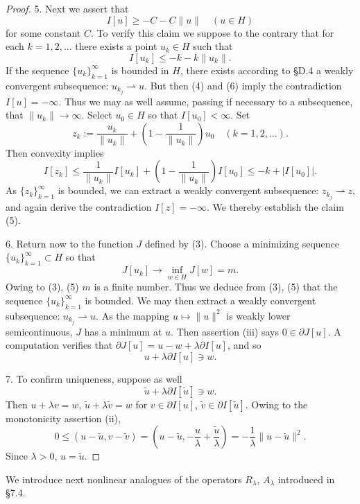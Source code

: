 \begin{proof}
5. Next we assert that
\[
I[u] \geq -C - C\|u\| \quad (u \in H)
\tag{5}
\]
for some constant $C$. To verify this claim we suppose to the contrary that for each $k = 1,2,\ldots$ there exists a point $u_k \in H$ such that
\[
I[u_k] \leq -k - k\|u_k\|.
\tag{6}
\]
If the sequence $\{u_k\}_{k=1}^\infty$ is bounded in $H$, there exists according to \S D.4 a weakly convergent subsequence: $u_{k_j} \rightharpoonup u$. But then (4) and (6) imply the contradiction $I[u] = -\infty$. Thus we may as well assume, passing if necessary to a subsequence, that $\|u_k\| \to \infty$. Select $u_0 \in H$ so that $I[u_0] < \infty$. Set
\[
z_k := \frac{u_k}{\|u_k\|} + \left(1 - \frac{1}{\|u_k\|}\right) u_0 \quad (k = 1,2,\ldots).
\]
Then convexity implies
\[
I[z_k] \le \frac{1}{\|u_k\|}I[u_k] + \left(1 - \frac{1}{\|u_k\|}\right) I[u_0] \le -k + |I[u_0]|.
\]
As $\{z_k\}_{k=1}^\infty$ is bounded, we can extract a weakly convergent subsequence: $z_{k_j} \rightharpoonup z$, and again derive the contradiction $I[z] = -\infty$. We thereby establish the claim (5).

6. Return now to the function $J$ defined by (3). Choose a minimizing sequence $\{u_k\}_{k=1}^\infty \subset H$ so that
\[
J[u_k] \to \inf_{w\in H} J[w] = m.
\]
Owing to (3), (5) $m$ is a finite number. Thus we deduce from (3), (5) that the sequence $\{u_k\}_{k=1}^\infty$ is bounded. We may then extract a weakly convergent subsequence: $u_{k_j} \rightharpoonup u$. As the mapping $u \mapsto \|u\|^2$ is weakly lower semicontinuous, $J$ has a minimum at $u$. Then assertion (iii) says $0 \in \partial J[u]$. A computation verifies that $\partial J[u] = u - w + \lambda \partial I[u]$, and so
\[
u + \lambda \partial I[u] \ni w.
\]

7. To confirm uniqueness, suppose as well
\[
\tilde{u} + \lambda \partial I[\tilde{u}] \ni w.
\]
Then $u + \lambda v = w$, $\tilde{u} + \lambda \tilde{v} = w$ for $v \in \partial I[u]$, $\tilde{v} \in \partial I[\tilde{u}]$. Owing to the monotonicity assertion (ii),
\[
0 \le (u - \tilde{u}, v - \tilde{v}) = \left(u - \tilde{u}, -\frac{u}{\lambda} + \frac{\tilde{u}}{\lambda}\right) = -\frac{1}{\lambda}\|u - \tilde{u}\|^2.
\]
Since $\lambda > 0$, $u = \tilde{u}$.
\end{proof}

We introduce next nonlinear analogues of the operators $R_\lambda$, $A_\lambda$ introduced in \S7.4.

